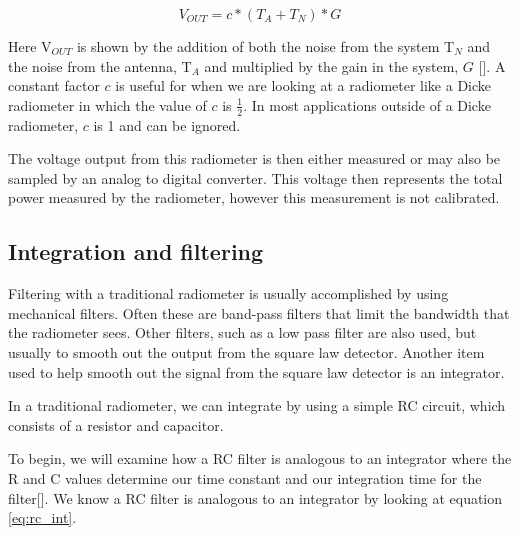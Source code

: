 \begin{equation} \label{eq:vout_1}
V_{OUT}=c*(T_A+T_N)*G
\end{equation}

Here V$_{OUT}$ is shown by the addition of both the noise from the system T$_N$ and the noise from the antenna, T$_A$ and multiplied by the gain in the system, $G$ [\cite{skou}].  A constant factor $c$ is useful for when we are looking at a radiometer like a Dicke radiometer in which the value of $c$ is $\frac{1}{2}$.  In most applications outside of a Dicke radiometer, $c$ is 1 and can be ignored.  

The voltage output from this radiometer is then either measured or may also be sampled by an analog to digital converter.  This voltage then represents the total power measured by the radiometer, however this measurement is not calibrated.


\subsection{Integration and filtering}\label{int_filt}

Filtering with a traditional radiometer is usually accomplished by using mechanical filters.  Often these are band-pass filters that limit the bandwidth that the radiometer sees.  Other filters, such as a low pass filter are also used, but usually to smooth out the output from the square law detector.  Another item used to help smooth out the signal from the square law detector is an integrator.

In a traditional radiometer, we can integrate by using a simple RC circuit, which consists of a resistor and capacitor.

To begin, we will examine how a RC filter is analogous to an integrator where the R and C values determine our time constant and our integration time for the filter[\cite{Aitken}].  We know a RC filter is analogous to an integrator by looking at equation \ref{eq:rc_int}.  

